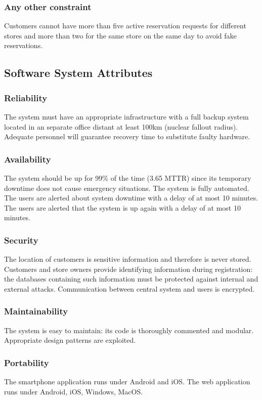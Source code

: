 \subsubsection{Any other constraint}
Customers cannot have more than five active reservation requests for different stores and more than two for the same store on the same day to avoid fake reservations.
\subsection{Software System Attributes}
\subsubsection{Reliability}
The system must have an appropriate infrastructure with a full backup system located in an separate office distant at least 100km (nuclear fallout radius). Adequate personnel will guarantee recovery time to substitute faulty hardware.
\subsubsection{Availability}
The system should be up for 99\% of the time (3.65 MTTR) since its temporary downtime does not cause emergency situations. The system is fully automated. The users are alerted about system downtime with a delay of at most 10 minutes. The users are alerted that the system is up again with a delay of at most 10 minutes.
\subsubsection{Security}
The location of customers is sensitive information and therefore is never stored. Customers and store owners provide identifying information during registration: the databases containing such information must be protected against internal and external attacks. Communication between central system and users is encrypted.
\subsubsection{Maintainability}
The system is easy to maintain: its code is thoroughly commented and modular. Appropriate design patterns are exploited.
\subsubsection{Portability}
The smartphone application runs under Android and iOS. The web application runs under Android, iOS, Windows, MacOS.